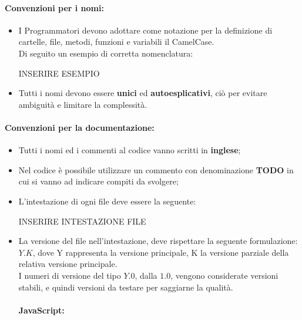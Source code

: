 \paragraph{Convenzioni per i nomi:}
\begin{itemize}	
	\item I Programmatori devono adottare come notazione per la definizione di cartelle, file, metodi, funzioni e variabili il CamelCase\glossario.\\
	Di seguito un esempio di corretta nomenclatura:
	\begin{tcolorbox}
		\begin{center}
			INSERIRE ESEMPIO 
		\end{center}
	\end{tcolorbox}

	\item Tutti i nomi devono essere \textbf{unici} ed \textbf{autoesplicativi}, ciò per evitare ambiguità e limitare la complessità.
\end{itemize}
\paragraph{Convenzioni per la documentazione:}
\begin{itemize}	
	\item Tutti i nomi ed i commenti al codice vanno scritti in \textbf{inglese};
	\item Nel codice è possibile utilizzare un commento con denominazione \textbf{TODO} in cui si vanno ad indicare compiti da svolgere;
	\item L'intestazione di ogni file deve essere la seguente:
	\begin{tcolorbox}
		\begin{center}
			INSERIRE INTESTAZIONE FILE 
		\end{center}
	\end{tcolorbox}
	\item La versione del file nell'intestazione, deve rispettare la seguente formulazione: $Y.K$, dove Y rappresenta la versione principale, K la versione parziale della relativa versione principale.\\ I numeri di versione del tipo $Y.0$, dalla $1.0$, vengono considerate versioni stabili, e quindi versioni da testare per saggiarne la qualità.
	
\paragraph{JavaScript:}
\end{itemize}

